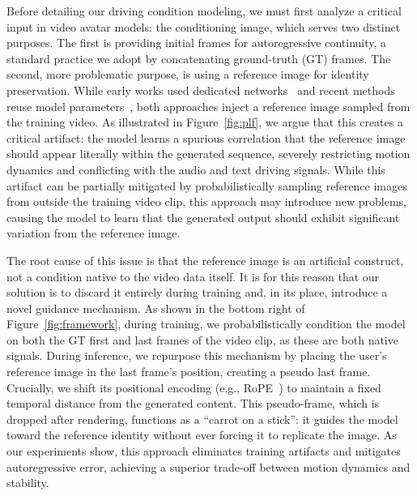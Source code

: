  Before detailing our driving condition modeling, we must first analyze a critical input in video avatar models: the conditioning image, which serves two distinct purposes. The first is providing initial frames for autoregressive continuity, a standard practice we adopt by concatenating ground-truth (GT) frames. The second, more problematic purpose, is using a reference image for identity preservation. While early works used dedicated networks~\cite{aa,tian2024emo,zhu2023tryondiffusion} and recent methods reuse model parameters~\cite{lin2025omnihuman,kong2025multitalk}, both approaches inject a reference image sampled from the training video. As illustrated in Figure~\ref{fig:plf}, we argue that this creates a critical artifact: the model learns a spurious correlation that the reference image should appear literally within the generated sequence, severely restricting motion dynamics and conflicting with the audio and text driving signals. While this artifact can be partially mitigated by probabilistically sampling reference images from outside the training video clip, this approach may introduce new problems, causing the model to learn that the generated output should exhibit significant variation from the reference image. 


\par
The root cause of this issue is that the reference image is an artificial construct, not a condition native to the video data itself. It is for this reason that our solution is to discard it entirely during training and, in its place, introduce a novel guidance mechanism. As shown in the bottom right of Figure~\ref{fig:framework}, during training, we probabilistically condition the model on both the GT first and last frames of the video clip, as these are both native signals. During inference, we repurpose this mechanism by placing the user's reference image in the last frame's position, creating a pseudo last frame. Crucially, we shift its positional encoding (e.g., RoPE~\cite{rope}) to maintain a fixed temporal distance from the generated content. This pseudo-frame, which is dropped after rendering, functions as a ``carrot on a stick'': it guides the model toward the reference identity without ever forcing it to replicate the image. As our experiments show, this approach eliminates training artifacts and mitigates autoregressive error, achieving a superior trade-off between motion dynamics and stability.



